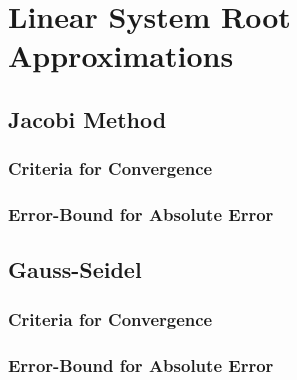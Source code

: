 \section{Linear System Root Approximations}

	\subsection{Jacobi Method}

		\subsubsection{Criteria for Convergence}

		\subsubsection{Error-Bound for Absolute Error}

	\subsection{Gauss-Seidel}

		\subsubsection{Criteria for Convergence}

		\subsubsection{Error-Bound for Absolute Error}
